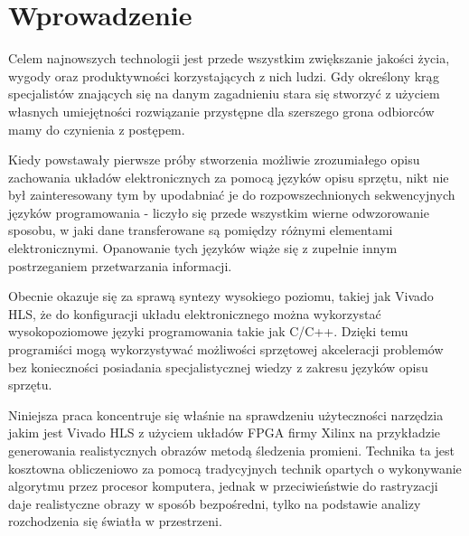 \chapter*{Wprowadzenie}
{

\pagestyle{empty}
\pagestyle{fancy}
\fancyhead{} %
\fancyhead[RO,LE]{\thepage}

Celem najnowszych technologii jest przede wszystkim zwiększanie jakości życia, wygody oraz produktywności korzystających z nich ludzi. Gdy określony krąg specjalistów znających się na danym zagadnieniu stara się stworzyć z użyciem własnych umiejętności rozwiązanie przystępne dla szerszego grona odbiorców mamy do czynienia z postępem.

Kiedy powstawały pierwsze próby stworzenia możliwie zrozumiałego opisu zachowania układów elektronicznych za pomocą języków opisu sprzętu, nikt nie był zainteresowany tym by upodabniać je do rozpowszechnionych sekwencyjnych języków programowania - liczyło się przede wszystkim wierne odwzorowanie sposobu, w jaki dane transferowane są pomiędzy różnymi elementami elektronicznymi. Opanowanie tych języków wiąże się z zupełnie innym postrzeganiem przetwarzania informacji. 

Obecnie okazuje się za sprawą syntezy wysokiego poziomu, takiej jak Vivado HLS, że do konfiguracji układu elektronicznego można wykorzystać wysokopoziomowe języki programowania takie jak C/C++. Dzięki temu programiści mogą wykorzystywać możliwości sprzętowej akceleracji problemów bez konieczności posiadania specjalistycznej wiedzy z zakresu języków opisu sprzętu.

Niniejsza praca koncentruje się właśnie na sprawdzeniu użyteczności narzędzia jakim jest Vivado HLS z użyciem układów FPGA firmy Xilinx na przykładzie generowania realistycznych obrazów metodą śledzenia promieni. Technika ta jest kosztowna obliczeniowo za pomocą tradycyjnych technik opartych o wykonywanie algorytmu przez procesor komputera, jednak w przeciwieństwie do rastryzacji daje realistyczne obrazy w sposób bezpośredni, tylko na podstawie analizy rozchodzenia się światła w przestrzeni.

}
